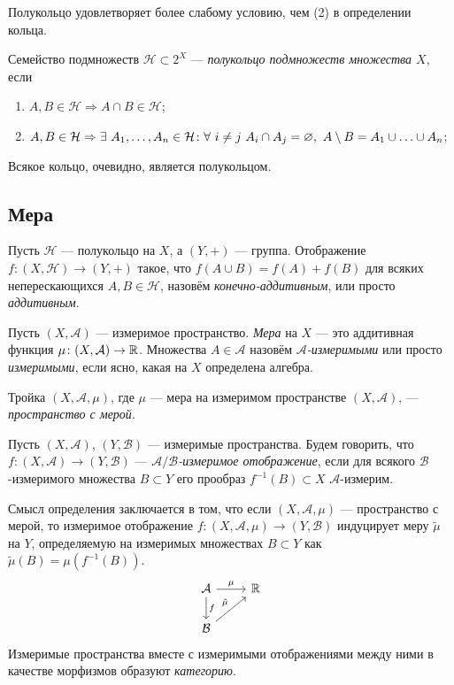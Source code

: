 Полукольцо удовлетворяет более слабому условию, чем (2) в определении кольца.
\begin{defin}
	Семейство подмножеств $\mathcal{H}\subset 2^X$ --- \textit{полукольцо подмножеств множества $X$}, если
	\begin{enumerate}
		\item $A,B\in\mathcal{H}\Rightarrow A\cap B\in\mathcal{H}$;
		\item $A,B\in\mathcal{H}\Rightarrow\exists\ A_1,\ldots,A_n\in\mathcal{H}\such \forall\ i\neq j\ A_i\cap A_j=\varnothing,\ A\setminus B=A_1\cup\ldots\cup A_n$;
	\end{enumerate}
\end{defin}
Всякое кольцо, очевидно, является полукольцом.

\subsection{Мера}
\begin{defin}
	Пусть $\mathcal{H}$ --- полукольцо на $X$, а $(Y,+)$ --- группа. Отображение $f\colon(X,\mathcal{H})\to(Y,+)$ такое, что $f(A\cup B)=f(A)+f(B)$ для всяких неперескающихся $A,B\in\mathcal{H}$, назовём \textit{конечно-аддитивным}, или просто \textit{аддитивным}.
\end{defin}
\begin{defin}
	Пусть $(X,\mathcal{A})$ --- измеримое пространство. \textit{Мера} на $X$ --- это аддитивная функция $\mu\colon(X,\mathcal{A})\to\mathbb {R}$. Множества $A\in\mathcal{A}$ назовём \textit{$\mathcal{A}$-измеримыми} или просто \textit{измеримыми}, если ясно, какая на $X$ определена алгебра.
\end{defin}
\begin{defin}
	Тройка $(X,\mathcal{A},\mu)$, где $\mu$ --- мера на измеримом пространстве $(X,\mathcal{A})$, --- \textit{пространство с мерой}.
\end{defin}
\begin{defin}
	Пусть $(X,\mathcal{A})$, $(Y,\mathcal{B})$ --- измеримые пространства. Будем говорить, что $f\colon(X,\mathcal{A})\to(Y,\mathcal{B})$ --- \textit{$\mathcal{A}/\mathcal{B}$-измеримое отображение}, если для всякого $\mathcal{B}$-измеримого множества $B\subset Y$ его прообраз $f^{-1}(B)\subset X$ $\mathcal{A}$-измерим. 
\end{defin}
Смысл определения заключается в том, что если $(X,\mathcal{A},\mu)$ --- пространство с мерой, то измеримое отображение $f\colon(X,\mathcal{A},\mu)\to(Y,\mathcal{B})$ индуцирует меру $\tilde{\mu}$ на $Y$, определяемую на измеримых множествах $B\subset Y$ как $\tilde{\mu}(B)=\mu(f^{-1}(B))$.
	\begin{equation*}
		\begin{tikzcd}
			\mathcal{A} \arrow{r}{\mu} \arrow{d}{f} & \RR \\                       
			\mathcal{B} \arrow{ru}{\tilde{\mu}} & 
		\end{tikzcd}
	\end{equation*}
Измеримые пространства вместе с измеримыми отображениями между ними в качестве морфизмов образуют \textit{категорию}.

